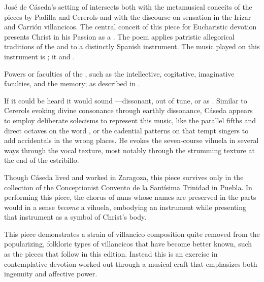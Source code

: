 José de Cáseda's setting of  intersects 
both with the metamusical conceits of the pieces by Padilla and Cererols and 
with the discourse on sensation in the Irízar and Carrión villancicos.
The central conceit of this piece for Eucharistic devotion presents Christ in 
his Passion as a .%
    \Autocite[375--405]{Cashner:PhD}
The poem applies patristic allegorical traditions of the  and 
 to a distinctly Spanish instrument.
The music played on this instrument is ; it 
 and .%
\begin{Footnote}
    Powers or faculties of the , such as
    the intellective, cogitative, imaginative faculties, and the memory; as
    described in \autocite[439--484]{LuisdeGranada-Balcells:SimboloPtI}.
\end{Footnote}
If it could be heard it would sound ---dissonant, out of tune, or 
as . 
Similar to Cererols evoking divine consonance through earthly dissonance, 
Cáseda appears to employ deliberate solecisms to represent this 
music, like the parallel fifths and direct octaves on the 
word , or the cadential patterns on 
that tempt singers to add accidentals in the wrong places.
He evokes the seven-course vihuela in several ways through the vocal texture, 
most notably through the strumming texture at the end of the estribillo.

Though Cáseda lived and worked in Zaragoza, this piece survives only in the
collection of the Conceptionist Convento de la Santísima Trinidad in Puebla.%
    \Autocite{Favila:PhD}
In performing this piece, the chorus of nuns whose names are preserved in the 
parts would in a sense \emph{become} a vihuela, embodying an instrument while 
presenting that instrument as a symbol of Christ's body.

This piece demonstrates a strain of villancico composition quite removed from 
the popularizing, folkloric types of villancicos that have become better known,
such as the pieces that follow in this edition.  
Instead this is an exercise in contemplative devotion worked out through a
musical craft that emphasizes both ingenuity and affective power.


